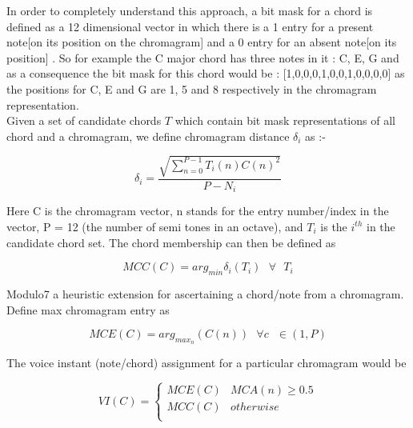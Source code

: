 \noindent In order to completely understand this approach, a bit mask for a chord is defined as a 12 dimensional vector in which there is a 1 entry for a present note[on its position on the chromagram] and a 0 entry for an absent note[on its position] \cite{chord-detection}. So for example the C major chord has three notes in it : C, E, G and as a consequence the bit mask for this chord would be : [1,0,0,0,1,0,0,1,0,0,0,0] as the positions for C, E and G are 1, 5 and 8 respectively in the chromagram representation. \\

\noindent Given a set of candidate chords $T$ which contain bit mask representations of all chord and a chromagram, we define chromagram distance $\delta_i$ as \cite{chord-detection}:-

\begin{equation}
\delta_i = \frac{\sqrt{\sum_{n = 0}^{P - 1} T_i(n)C(n)^2}}{P - N_i}
\end{equation}

\noindent Here C is the chromagram vector, n stands for the entry number/index in the vector, P = 12 (the number of semi tones in an octave), and $T_i$ is the $i^{th}$ in the candidate chord set. The chord membership can then be defined as 

\begin{equation}
MCC(C) = arg_{min} \delta_i (T_i) \ \ \ \forall \ \ \ T_i
\end{equation}

\noindent Modulo7 a heuristic extension for ascertaining a chord/note from a chromagram. Define max chromagram entry as 

\begin{equation}
MCE(C) = arg_{max_n}(C(n)) \ \ \ \forall c \ \ \ \in (1, P)
\end{equation}

\noindent The voice instant (note/chord) assignment for a particular chromagram would be 

\begin{equation}
VI(C) = \begin{cases}
      MCE(C) & MCA(n) \geq 0.5 \\
      MCC(C) & otherwise \\  \end{cases}
\end{equation}

